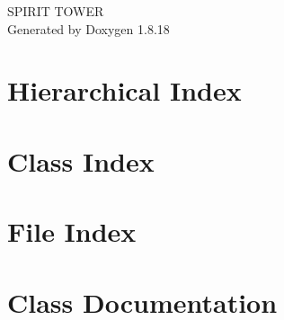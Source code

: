 \let\mypdfximage\pdfximage\def\pdfximage{\immediate\mypdfximage}\documentclass[twoside]{book}
\newcommand{\+}{\discretionary{\mbox{\scriptsize$\hookleftarrow$}}{}{}}
\newcommand{\clearemptydoublepage}{%
  \newpage{\pagestyle{empty}\cleardoublepage}%
}
\begin{document}
\hypersetup{pageanchor=false,
             bookmarksnumbered=true,
             pdfencoding=unicode
            }
\begin{titlepage}
\vspace*{7cm}
\begin{center}%
{\Large S\+P\+I\+R\+IT T\+O\+W\+ER }\\
\vspace*{1cm}
{\large Generated by Doxygen 1.8.18}\\
\end{center}
\end{titlepage}
\clearemptydoublepage
{}
\tableofcontents
\clearemptydoublepage
{}
\hypersetup{pageanchor=true}

\chapter{Hierarchical Index}

\chapter{Class Index}

\chapter{File Index}

\chapter{Class Documentation}































































\end{document}
